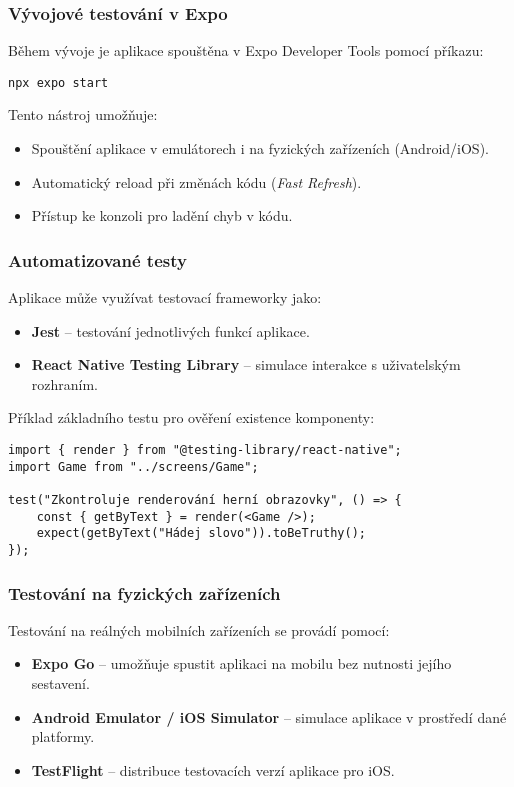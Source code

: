 \documentclass[a4paper,12pt]{article}
\begin{document}
\subsubsection{Vývojové testování v Expo}
Během vývoje je aplikace spouštěna v Expo Developer Tools pomocí příkazu:

\begin{verbatim}
npx expo start
\end{verbatim}

Tento nástroj umožňuje:
\begin{itemize}
    \item Spouštění aplikace v emulátorech i na fyzických zařízeních (Android/iOS).
    \item Automatický reload při změnách kódu (\textit{Fast Refresh}).
    \item Přístup ke konzoli pro ladění chyb v kódu.
\end{itemize}

\subsubsection{Automatizované testy}

Aplikace může využívat testovací frameworky jako:
\begin{itemize}
    \item \textbf{Jest} – testování jednotlivých funkcí aplikace.
    \item \textbf{React Native Testing Library} – simulace interakce s uživatelským rozhraním.
\end{itemize}

Příklad základního testu pro ověření existence komponenty:

\begin{verbatim}
import { render } from "@testing-library/react-native";
import Game from "../screens/Game";

test("Zkontroluje renderování herní obrazovky", () => {
    const { getByText } = render(<Game />);
    expect(getByText("Hádej slovo")).toBeTruthy();
});
\end{verbatim}

\subsubsection{Testování na fyzických zařízeních}

Testování na reálných mobilních zařízeních se provádí pomocí:
\begin{itemize}
    \item \textbf{Expo Go} – umožňuje spustit aplikaci na mobilu bez nutnosti jejího sestavení.
    \item \textbf{Android Emulator / iOS Simulator} – simulace aplikace v prostředí dané platformy.
    \item \textbf{TestFlight} – distribuce testovacích verzí aplikace pro iOS.
\end{itemize}
\end{document}
